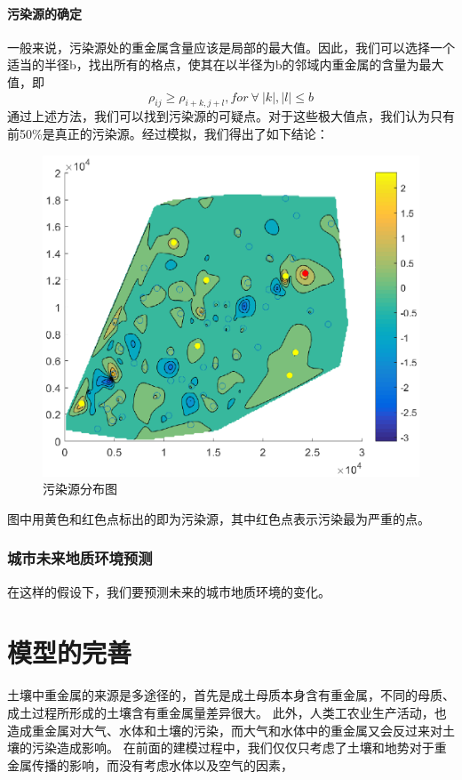 \documentclass[a4paper]{article}
\begin{document}
\subsection{污染源的确定}
一般来说，污染源处的重金属含量应该是局部的最大值。因此，我们可以选择一个适当的半径b，找出所有的格点，使其在以半径为b的邻域内重金属的含量为最大值，即
\begin{equation}
\rho_{ij} \geq \rho_{i+k, j+l}, for\ \forall \ |k|, |l| \le b
\end{equation}
通过上述方法，我们可以找到污染源的可疑点。对于这些极大值点，我们认为只有前50\%是真正的污染源。经过模拟，我们得出了如下结论：
\begin{figure}
    \includegraphics{pictures/polluted-source.eps}
    \caption{污染源分布图}
    \label{fig:polluted-source}
\end{figure}
图中用黄色和红色点标出的即为污染源，其中红色点表示污染最为严重的点。
\section{城市未来地质环境预测}
在这样的假设下，我们要预测未来的城市地质环境的变化。




\part{模型的完善}
土壤中重金属的来源是多途径的，首先是成土母质本身含有重金属，不同的母质、成土过程所形成的土壤含有重金属量差异很大。
此外，人类工农业生产活动，也造成重金属对大气、水体和土壤的污染，而大气和水体中的重金属又会反过来对土壤的污染造成影响。
在前面的建模过程中，我们仅仅只考虑了土壤和地势对于重金属传播的影响，而没有考虑水体以及空气的因素，
\end{document}
